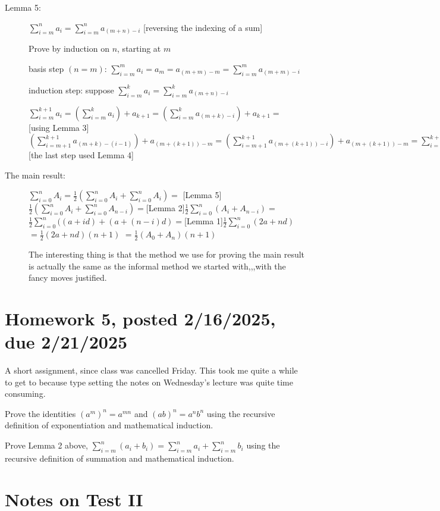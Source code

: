 \documentclass[12pt]{article}
\begin{document}
\begin{description}
\item[Lemma 5:] $\sum_{i=m}^n a_i = \sum_{i=m}^n a_{(m+n)-i}$  [reversing the indexing of a sum]

Prove by induction on $n$, starting at $m$

basis step $(n=m)$:  $\sum_{i=m}^m a_i = a_m = a_{(m+m)-m} = \sum_{i=m}^m a_{(m+m)-i}$

induction step:  suppose $\sum_{i=m}^k a_i = \sum_{i=m}^k a_{(m+n)-i}$

$\sum_{i=m}^{k+1} a_i =(\sum_{i=m}^k a_i )+ a_{k+1} = (\sum_{i=m}^ka_{(m+k)-i}) + a_{k+1} =$ [using Lemma 3] $(\sum_{i=m+1}^{k+1}a_{(m+k)-(i-1)}) + a_{(m+(k+1))-m} = (\sum_{i=m+1}^{k+1}a_{(m+(k+1))-i}) + a_{(m+(k+1))-m} = \sum_{i=m}^{k+1}a_{(m+(k+1))-i}$ [the last step used Lemma 4]

\item[The main result:]  $\sum_{i=0}^n A_i = \frac12(\sum_{i=0}^n A_i + \sum_{i=0}^n A_i) = $ [Lemma 5]\newline$\frac12(\sum_{i=0}^n A_i + \sum_{i=0}^n A_{n-i}) = $[Lemma 2]$ \frac 12\sum_{i=0}^n(A_i+A_{n-i}) =$\newline$ \frac12\sum_{i=0}^n((a+id) + (a+(n-i)d) = $[Lemma 1]$\frac12 \sum_{i=0}^n(2a+nd) $\newline$= \frac12(2a+nd)(n+1) $ $= \frac12(A_0 + A_n)(n+1)$

The interesting thing is that the method we use for proving the main result is actually the same as the informal method we started with,,,with the fancy moves justified.



\end{description}

\section{Homework 5, posted 2/16/2025, due 2/21/2025}

A short assignment, since class was cancelled Friday.  This took me quite a while to get to because type setting the notes on Wednesday's lecture was quite time consuming.

Prove the identities $(a^m)^n=a^{mn}$ and $(ab)^n = a^nb^n$ using the recursive definition of exponentiation and mathematical induction.

Prove Lemma 2 above, $\sum_{i=m}^n (a_i + b_i) = \sum_{i=m}^n a_i + \sum_{i=m}^n b_i$ using the recursive definition of summation and mathematical induction.

\section{Notes on Test II}
\end{document}
